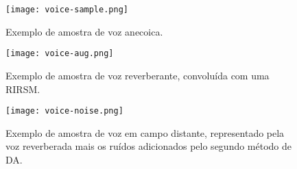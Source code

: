 \begin{figure} [H]
    \centering
    \texttt{[image: voice-sample.png]}
    \caption{Exemplo de amostra de voz anecoica.}
    \label{fig:voice-sample}
\end{figure} 

\begin{figure} [H]
    \centering
    \texttt{[image: voice-aug.png]}
    \caption{Exemplo de amostra de voz reverberante, convoluída com uma RIRSM.}
    \label{fig:voice-aug}
\end{figure} 

\begin{figure} [H]
    \centering
    \texttt{[image: voice-noise.png]}
    \caption{Exemplo de amostra de voz em campo distante, representado pela voz reverberada mais os ruídos adicionados pelo segundo método de DA.}
    \label{fig:voice-noise}
\end{figure} 